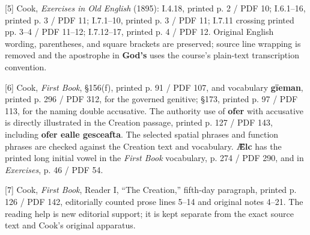 [5] Cook, \emph{Exercises in Old English} (1895): I.4.18, printed p. 2 /\allowbreak{} PDF 10; I.6.1–16, printed p. 3 /\allowbreak{} PDF 11; I.7.1–10, printed p. 3 /\allowbreak{} PDF 11; I.7.11 crossing printed pp. 3–4 /\allowbreak{} PDF 11–12; I.7.12–17, printed p. 4 /\allowbreak{} PDF 12. Original English wording, parentheses, and square brackets are preserved; source line wrapping is removed and the apostrophe in \textbf{God's} uses the course’s plain-text transcription convention.

[6] Cook, \emph{First Book}, §156(f), printed p. 91 /\allowbreak{} PDF 107, and vocabulary \textbf{gīeman}, printed p. 296 /\allowbreak{} PDF 312, for the governed genitive; §173, printed p. 97 /\allowbreak{} PDF 113, for the naming double accusative. The authority use of \textbf{ofer} with accusative is directly illustrated in the Creation passage, printed p. 127 /\allowbreak{} PDF 143, including \textbf{ofer ealle gesceafta}. The selected spatial phrases and function phrases are checked against the Creation text and vocabulary. \textbf{Ǣlc} has the printed long initial vowel in the \emph{First Book} vocabulary, p. 274 /\allowbreak{} PDF 290, and in \emph{Exercises}, p. 46 /\allowbreak{} PDF 54.

[7] Cook, \emph{First Book}, Reader I, “The Creation,” fifth-day paragraph, printed p. 126 /\allowbreak{} PDF 142, editorially counted prose lines 5–14 and original notes 4–21. The reading help is new editorial support; it is kept separate from the exact source text and Cook’s original apparatus.

\endgroup

\par\label{end-ch07-key}
\clearpage\endgroup
